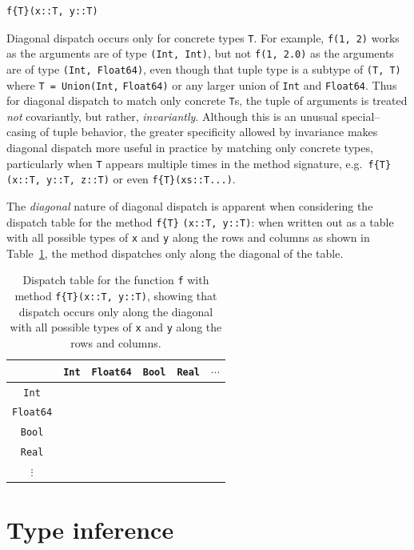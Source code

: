 \documentclass[pldi]{sigplanconf-pldi15}
\begin{document}
\begin{lstlisting}
f{T}(x::T, y::T)
\end{lstlisting}
%
Diagonal dispatch occurs only for concrete types \verb|T|. For example,
\verb|f(1, 2)| works as the arguments are of type \verb|(Int, Int)|, but not
\verb|f(1, 2.0)| as the arguments are of type \verb|(Int, Float64)|, even
though that tuple type is a subtype of \verb|(T, T)| where
\verb|T = Union(Int,| \verb|Float64)| or any larger union of \verb|Int| and
\verb|Float64|. Thus for diagonal dispatch to match only concrete \verb|T|s,
the tuple of arguments is treated \textit{not} covariantly, but rather,
\textit{invariantly}. Although this is an unusual special--casing of tuple
behavior, the greater specificity allowed by invariance makes diagonal dispatch
more useful in practice by matching only concrete types, particularly when
\verb|T| appears multiple times in the method signature, e.g.\ 
\verb|f{T}(x::T, y::T, z::T)| or even \verb|f{T}(xs::T...)|. 

The \textit{diagonal} nature of diagonal dispatch is apparent when considering
the dispatch table for the method \verb|f{T}| \verb|(x::T, y::T)|: when written
out as a table with all possible types of \texttt{x} and \texttt{y} along the
rows and columns as shown in Table~\ref{tab:diagonal}, the method dispatches
only along the diagonal of the table.

\begin{table}
\begin{tabular}{c | c c c c c}
	& \verb|Int| & \verb|Float64| & \verb|Bool| & \verb|Real| & $\cdots$ \\ \hline
	\verb|Int|     & \checkmark &  &  &  & \\
	\verb|Float64| &  & \checkmark &  &  & \\
	\verb|Bool|    &  &  & \checkmark &  & \\
	\verb|Real|    &  &  &  &  & \\
	$\vdots$       &  &  &  &  &
\end{tabular}
\caption{Dispatch table for the function \texttt{f} with method
\texttt{f\{T\}(x::T, y::T)}, showing that dispatch occurs only along the
diagonal with all possible types of \texttt{x} and \texttt{y} along the rows
and columns.}
\label{tab:diagonal}
\end{table}


\section{Type inference}
\end{document}
